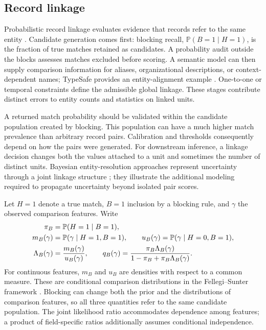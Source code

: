 \documentclass[11pt,a4paper]{article}
\newcommand{\Prob}{\mathbb{P}}
\begin{document}
\subsection{Record linkage}

Probabilistic record linkage evaluates evidence that records refer to the same entity \citep{fellegi1969}. Candidate generation comes first: blocking recall, $\Prob(B=1\mid H=1)$, is the fraction of true matches retained as candidates. A probability audit outside the blocks assesses matches excluded before scoring. A semantic model can then supply comparison information for aliases, organizational descriptions, or context-dependent names; TypeSafe provides an entity-alignment example \citep{typesafe-entity}. One-to-one or temporal constraints define the admissible global linkage. These stages contribute distinct errors to entity counts and statistics on linked units.

A returned match probability should be validated within the candidate population created by blocking. This population can have a much higher match prevalence than arbitrary record pairs. Calibration and thresholds consequently depend on how the pairs were generated. For downstream inference, a linkage decision changes both the values attached to a unit and sometimes the number of distinct units. Bayesian entity-resolution approaches represent uncertainty through a joint linkage structure \citep{steorts2016}; they illustrate the additional modeling required to propagate uncertainty beyond isolated pair scores.

Let $H=1$ denote a true match, $B=1$ inclusion by a blocking rule, and $\gamma$ the observed comparison features. Write
\begin{align}
 \pi_B&=\Prob(H=1\mid B=1),\notag\\
 m_B(\gamma)&=\Prob(\gamma\mid H=1,B=1),\qquad
 u_B(\gamma)=\Prob(\gamma\mid H=0,B=1),\notag\\
 \Lambda_B(\gamma)&=\frac{m_B(\gamma)}{u_B(\gamma)},\qquad
 q_B(\gamma)=\frac{\pi_B\Lambda_B(\gamma)}
                     {1-\pi_B+\pi_B\Lambda_B(\gamma)}.
 \label{eq:linkage-posterior}
\end{align}
For continuous features, $m_B$ and $u_B$ are densities with respect to a common measure. These are conditional comparison distributions in the Fellegi--Sunter framework \citep{fellegi1969}. Blocking can change both the prior and the distributions of comparison features, so all three quantities refer to the same candidate population. The joint likelihood ratio accommodates dependence among features; a product of field-specific ratios additionally assumes conditional independence.
\end{document}
